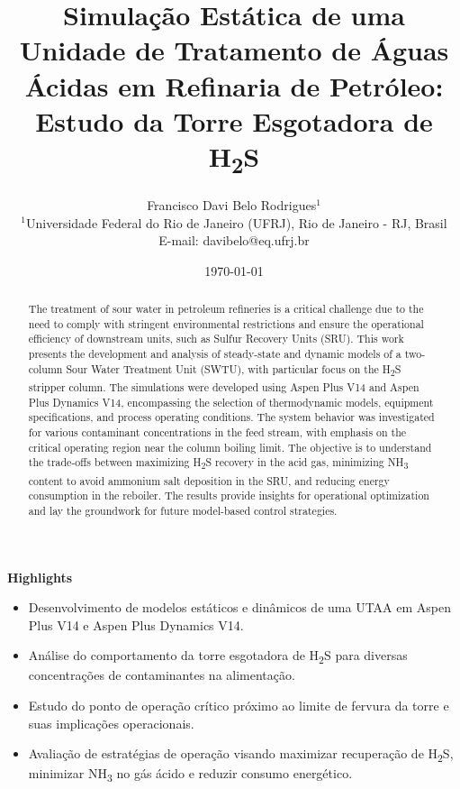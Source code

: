 \documentclass[10pt,a4paper]{article}
\title{Simulação Estática de uma Unidade de Tratamento de Águas Ácidas em Refinaria de Petróleo: Estudo da Torre Esgotadora de H\textsubscript{2}S}
\author{%
  Francisco Davi Belo Rodrigues$^{1}$\\
  \small $^{1}$Universidade Federal do Rio de Janeiro (UFRJ), Rio de Janeiro - RJ, Brasil\\  
  \small E-mail: davibelo@eq.ufrj.br
}
\date{\today}
\begin{document}
\maketitle

\noindent\textbf{Highlights}
\begin{itemize}[leftmargin=4em, itemsep=0pt]
  \item Desenvolvimento de modelos estáticos e dinâmicos de uma UTAA em Aspen Plus V14 e Aspen Plus Dynamics V14.
  \item Análise do comportamento da torre esgotadora de H\textsubscript{2}S para diversas concentrações de contaminantes na alimentação.
  \item Estudo do ponto de operação crítico próximo ao limite de fervura da torre e suas implicações operacionais.
  \item Avaliação de estratégias de operação visando maximizar recuperação de H\textsubscript{2}S, minimizar NH\textsubscript{3} no gás ácido e reduzir consumo energético.
\end{itemize}

\vspace{0.5em}

\begin{otherlanguage}{english}
\begin{abstract}
The treatment of sour water in petroleum refineries is a critical challenge due to the need to comply with stringent environmental restrictions and ensure the operational efficiency of downstream units, such as Sulfur Recovery Units (SRU). This work presents the development and analysis of steady-state and dynamic models of a two-column Sour Water Treatment Unit (SWTU), with particular focus on the H\textsubscript{2}S stripper column. The simulations were developed using Aspen Plus V14 and Aspen Plus Dynamics V14, encompassing the selection of thermodynamic models, equipment specifications, and process operating conditions. The system behavior was investigated for various contaminant concentrations in the feed stream, with emphasis on the critical operating region near the column boiling limit. The objective is to understand the trade-offs between maximizing H\textsubscript{2}S recovery in the acid gas, minimizing NH\textsubscript{3} content to avoid ammonium salt deposition in the SRU, and reducing energy consumption in the reboiler. The results provide insights for operational optimization and lay the groundwork for future model-based control strategies.
\end{abstract}
\end{otherlanguage}
\end{document}
